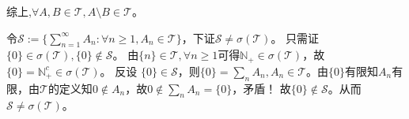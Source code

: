 \documentclass{ctexart}
\begin{document}
\begin{solution}
\begin{enumerate}
      综上,\(\forall A,B \in \mathcal{T},A \setminus B \in \mathcal{T} \)。
  \end{enumerate}
  令\(\mathcal{S}:= \{\sum_{n=1}^{\infty} A_n:\forall n \geq 1, A_n \in \mathcal{T}\} \)，下证\(\mathcal{S} \neq \sigma(\mathcal{T}) \)。
  只需证\(\{0\} \in \sigma(\mathcal{T}),\{0\} \notin \mathcal{S} \)。
  由\(\{n\} \in \mathcal{T},\forall n \geq 1 \)可得\(\mathbb{N}_+ \in \sigma(\mathcal{T}) \)，故\(\{0\}=\mathbb{N}_+^c \in \sigma(\mathcal{T}) \)。
  反设 \( \{0\} \in \mathcal{S} \)，则\(\{0\}=\sum_{n}A_n,A_n \in \mathcal{T} \)。由\(\{0\} \)有限知\(A_n \)有限，由\(\mathcal{T} \)的定义知\(0 \notin A_n \)，故\(0 \notin \sum_{n}A_n=\{0\} \)，矛盾！
  故\(\{0\}\notin \mathcal{S} \)。从而 \( \mathcal{S} \neq \sigma(\mathcal{T}) \)。


\end{solution}
\end{document}
